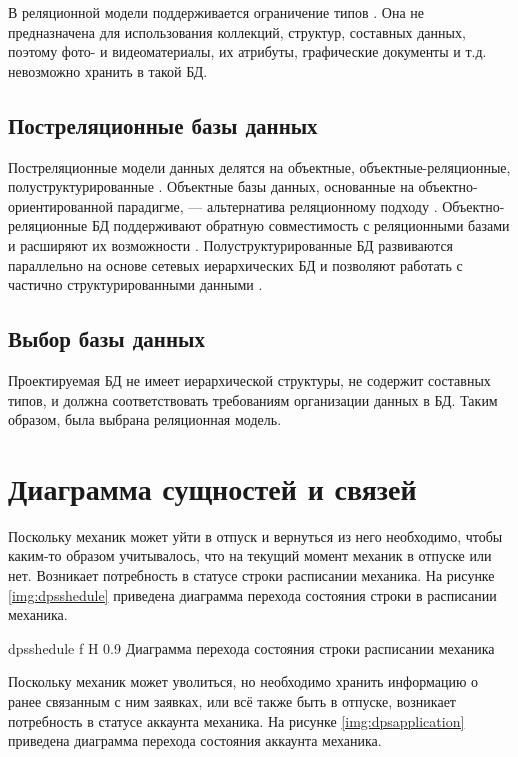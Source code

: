 В реляционной модели поддерживается ограничение типов \cite{postrelat}. Она не предназначена для использования коллекций, структур, составных данных, поэтому фото- и видеоматериалы, их атрибуты, графические документы и т.д. невозможно хранить в такой БД.

\subsection{Постреляционные базы данных}

Постреляционные модели данных делятся на объектные, объектные-реляционные, полуструктурированные \cite{postrelat}. Объектные базы данных, основанные на объектно-ориентированной парадигме, — альтернатива реляционному подходу \cite{postrelat}. Объектно-реляционные БД поддерживают обратную совместимость с реляционными базами и расширяют их возможности \cite{postrelat}. Полуструктурированные БД развиваются параллельно на основе сетевых иерархических БД и позволяют работать с частично структурированными данными \cite{postrelat}.

\subsection{Выбор базы данных}

Проектируемая БД не имеет иерархической структуры, не содержит составных типов, и должна соответствовать требованиям организации данных в БД. Таким образом, была выбрана реляционная модель.

\section{Диаграмма сущностей и связей}

Поскольку механик может уйти в отпуск и вернуться из него необходимо, чтобы каким-то образом учитывалось, что на текущий момент механик в отпуске или нет. 
Возникает потребность в статусе строки расписании механика.
На рисунке \ref{img:dpsshedule} приведена диаграмма перехода состояния строки в расписании механика.

{dpsshedule}
{f}
{H}
{0.9\textwidth}
{Диаграмма перехода состояния строки расписании механика}

Поскольку механик может уволиться, но необходимо хранить информацию о ранее связанным с ним заявках, или всё также быть в отпуске, возникает потребность в статусе аккаунта механика. 
На рисунке \ref{img:dpsapplication} приведена диаграмма перехода состояния аккаунта механика.

